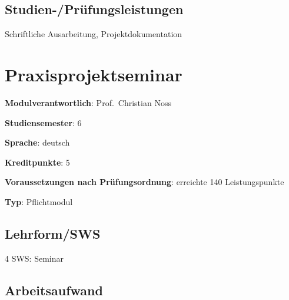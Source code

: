 \section*{Studien-/Prüfungsleistungen\label{/mi-2017/modulbeschreibungen-bachelor/BA_Praxisprojektarbeit}}\label{studien-pruxfcfungsleistungenpathlabelmi-2017modulbeschreibungen-bachelorbaux5fpraxisprojektarbeit}

Schriftliche Ausarbeitung, Projektdokumentation

\chapter{Praxisprojektseminar\label{/mi-2017/modulbeschreibungen-bachelor/BA_Praxisprojektseminar}}\label{praxisprojektseminarpathlabelmi-2017modulbeschreibungen-bachelorbaux5fpraxisprojektseminar}

\begin{modulHead}
\textbf{Modulverantwortlich}: Prof.~Christian
Noss
\end{modulHead}
\begin{modulHead}
\textbf{Studiensemester}:
6
\end{modulHead}
\begin{modulHead}
\textbf{Sprache}:
deutsch
\end{modulHead}
\begin{modulHead}
\textbf{Kreditpunkte}:
5
\end{modulHead}
\begin{modulHead}
\textbf{Voraussetzungen nach
Prüfungsordnung}: erreichte 140
Leistungspunkte
\end{modulHead}
\begin{modulHead}
\textbf{Typ}:
Pflichtmodul
\end{modulHead}


\section*{Lehrform/SWS\label{/mi-2017/modulbeschreibungen-bachelor/BA_Praxisprojektseminar}}\label{lehrformswspathlabelmi-2017modulbeschreibungen-bachelorbaux5fpraxisprojektseminar}

4 SWS: Seminar

\section*{Arbeitsaufwand\label{/mi-2017/modulbeschreibungen-bachelor/BA_Praxisprojektseminar}}\label{arbeitsaufwandpathlabelmi-2017modulbeschreibungen-bachelorbaux5fpraxisprojektseminar}


